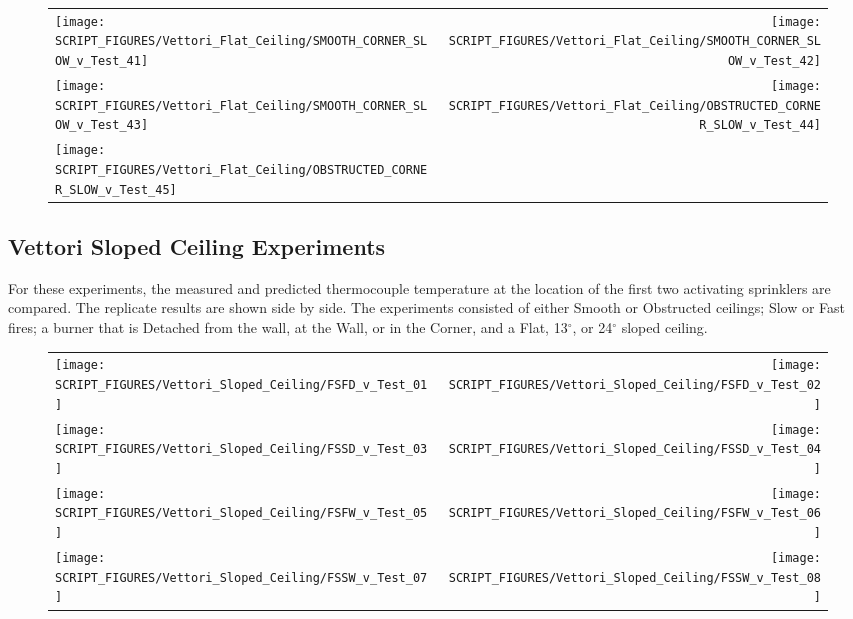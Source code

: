 \begin{figure}[p]
\begin{tabular*}{\textwidth}{l@{\extracolsep{\fill}}r}
\texttt{[image: SCRIPT\_FIGURES/Vettori\_Flat\_Ceiling/SMOOTH\_CORNER\_SLOW\_v\_Test\_41]} &
\texttt{[image: SCRIPT\_FIGURES/Vettori\_Flat\_Ceiling/SMOOTH\_CORNER\_SLOW\_v\_Test\_42]} \\
\texttt{[image: SCRIPT\_FIGURES/Vettori\_Flat\_Ceiling/SMOOTH\_CORNER\_SLOW\_v\_Test\_43]} &
\texttt{[image: SCRIPT\_FIGURES/Vettori\_Flat\_Ceiling/OBSTRUCTED\_CORNER\_SLOW\_v\_Test\_44]} \\
\texttt{[image: SCRIPT\_FIGURES/Vettori\_Flat\_Ceiling/OBSTRUCTED\_CORNER\_SLOW\_v\_Test\_45]} \\
\end{tabular*}
\label{Vettori_6}
\end{figure}


\clearpage

\subsection{Vettori Sloped Ceiling Experiments}
\label{Vettori_Sloped_Results}

For these experiments, the measured and predicted thermocouple temperature at the location of the first two activating sprinklers are compared. The replicate results are shown side by side. The experiments consisted of either Smooth or Obstructed ceilings; Slow or Fast fires; a burner that is Detached from the wall, at the Wall, or in the Corner, and a Flat, 13$^\circ$, or 24$^\circ$ sloped ceiling.

\newpage

\begin{figure}[p]
\begin{tabular*}{\textwidth}{l@{\extracolsep{\fill}}r}
\texttt{[image: SCRIPT\_FIGURES/Vettori\_Sloped\_Ceiling/FSFD\_v\_Test\_01]} &
\texttt{[image: SCRIPT\_FIGURES/Vettori\_Sloped\_Ceiling/FSFD\_v\_Test\_02]} \\
\texttt{[image: SCRIPT\_FIGURES/Vettori\_Sloped\_Ceiling/FSSD\_v\_Test\_03]} &
\texttt{[image: SCRIPT\_FIGURES/Vettori\_Sloped\_Ceiling/FSSD\_v\_Test\_04]} \\
\texttt{[image: SCRIPT\_FIGURES/Vettori\_Sloped\_Ceiling/FSFW\_v\_Test\_05]} &
\texttt{[image: SCRIPT\_FIGURES/Vettori\_Sloped\_Ceiling/FSFW\_v\_Test\_06]} \\
\texttt{[image: SCRIPT\_FIGURES/Vettori\_Sloped\_Ceiling/FSSW\_v\_Test\_07]} &
\texttt{[image: SCRIPT\_FIGURES/Vettori\_Sloped\_Ceiling/FSSW\_v\_Test\_08]} \\
\end{tabular*}
\label{Vettori_Sloped_1}
\end{figure}

